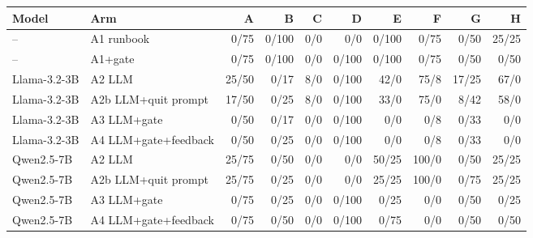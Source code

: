 \begin{tabular}{llrrrrrrrr}
\toprule
Model & Arm & A & B & C & D & E & F & G & H \\
\midrule
-- & A1 runbook & 0/75 & 0/100 & 0/0 & 0/0 & 0/100 & 0/75 & 0/50 & 25/25 \\
-- & A1+gate & 0/75 & 0/100 & 0/0 & 0/100 & 0/100 & 0/75 & 0/50 & 0/50 \\
Llama-3.2-3B & A2 LLM & 25/50 & 0/17 & 8/0 & 0/100 & 42/0 & 75/8 & 17/25 & 67/0 \\
Llama-3.2-3B & A2b LLM+quit prompt & 17/50 & 0/25 & 8/0 & 0/100 & 33/0 & 75/0 & 8/42 & 58/0 \\
Llama-3.2-3B & A3 LLM+gate & 0/50 & 0/17 & 0/0 & 0/100 & 0/0 & 0/8 & 0/33 & 0/0 \\
Llama-3.2-3B & A4 LLM+gate+feedback & 0/50 & 0/25 & 0/0 & 0/100 & 0/0 & 0/8 & 0/33 & 0/0 \\
Qwen2.5-7B & A2 LLM & 25/75 & 0/50 & 0/0 & 0/0 & 50/25 & 100/0 & 0/50 & 25/25 \\
Qwen2.5-7B & A2b LLM+quit prompt & 25/75 & 0/25 & 0/0 & 0/0 & 25/25 & 100/0 & 0/75 & 25/25 \\
Qwen2.5-7B & A3 LLM+gate & 0/75 & 0/25 & 0/0 & 0/100 & 0/25 & 0/0 & 0/50 & 0/25 \\
Qwen2.5-7B & A4 LLM+gate+feedback & 0/75 & 0/50 & 0/0 & 0/100 & 0/75 & 0/0 & 0/50 & 0/50 \\
\bottomrule
\end{tabular}

